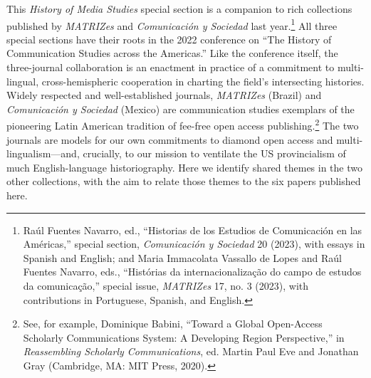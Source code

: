 \documentclass{tufte-handout}
\begin{document}
This \emph{History of Media Studies} special section is a companion to
rich collections published by \emph{MATRIZes} and \emph{Comunicación y
Sociedad} last year.\footnote{Raúl Fuentes Navarro, ed., ``Historias de
  los Estudios de Comunicación en las Américas,'' special section,
  \emph{Comunicación y Sociedad} 20 (2023), with essays in Spanish and
  English; and Maria Immacolata Vassallo de Lopes and Raúl Fuentes
  Navarro, eds., ``Histórias da internacionalização do campo de estudos
  da comunicação,'' special issue, \emph{MATRIZes} 17, no. 3 (2023),
  with contributions in Portuguese, Spanish, and English.} All three
special sections have their roots in the 2022 conference on ``The
History of Communication Studies across the Americas.'' Like the
conference itself, the three-journal collaboration is an enactment in
practice of a commitment to multi-lingual, cross-hemispheric cooperation
in charting the field's intersecting histories. Widely respected and
well-established journals, \emph{MATRIZes} (Brazil) and
\emph{Comunicación y Sociedad} (Mexico) are communication studies
exemplars of the pioneering Latin American tradition of fee-free open
access publishing.\footnote{See, for example, Dominique Babini, ``Toward
  a Global Open-Access Scholarly Communications System: A Developing
  Region Perspective,'' in \emph{Reassembling Scholarly Communications},
  ed. Martin Paul Eve and Jonathan Gray (Cambridge, MA: MIT Press,
  2020).} The two journals are models for our own commitments to diamond
open access and multi-lingualism---and, crucially, to our mission to
ventilate the US provincialism of much English-language historiography.
Here we identify shared themes in the two other collections, with the
aim to relate those themes to the six papers published here.
\end{document}

